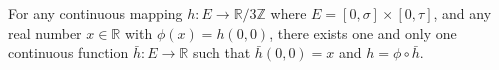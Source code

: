 For any continuous mapping $h: E \to \mathbb{R}/3\mathbb{Z}$ where $E = [0,\sigma] \times [0,\tau]$, and any real number $x \in \mathbb{R}$ with $\phi(x) = h(0,0)$, there exists one and only one continuous function $\bar{h}: E \to \mathbb{R}$ such that $\bar{h}(0,0) = x$ and $h = \phi \circ \bar{h}$.
